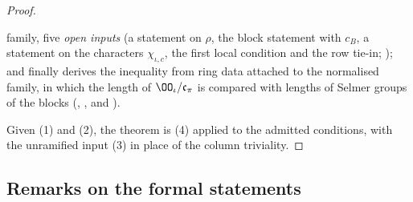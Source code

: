 \begin{proof}
\begin{enumerate}[label=(\arabic*)]
  family, five \emph{open inputs} (a statement on $\rho$, the block statement with $c_B$, a statement on the characters $\chi_{\iota,c}$, the first local
  condition and the row tie-in; ); and finally derives the inequality from ring data
  attached to the normalised family, in which the length of $\OO_\iota/\mathfrak c_\pi$ is compared with lengths of Selmer groups of the blocks
  (, , and ).
\end{enumerate}
Given (1) and (2), the theorem is (4) applied to the admitted conditions, with the unramified input (3) in place of the column triviality.
\end{proof}

\subsection{Remarks on the formal statements}\label{pf:sh-hodge:remarks}

